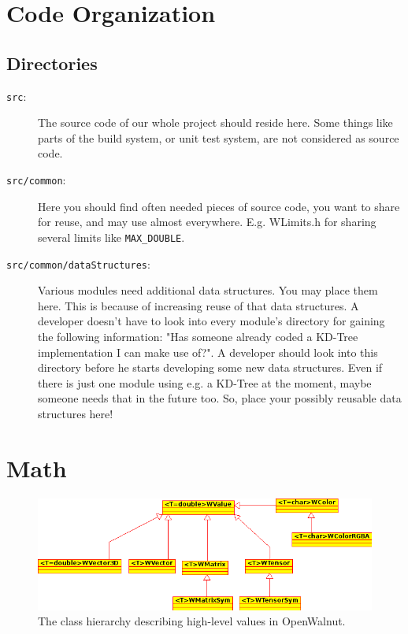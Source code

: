 \documentclass[a4paper,12pt]{scrbook}
\begin{document}
\chapter{Code Organization}
\section{Directories}
\begin{description}
  \item[\texttt{src}:] The source code of our whole project should reside here. Some things like parts of the build system, or unit test system, are not considered as source code.
  \item[\texttt{src/common}:] Here you should find often needed pieces of source code, you want to share for reuse, and may use almost everywhere. E.g. WLimits.h for sharing several limits like \texttt{MAX\_DOUBLE}.
  \item[\texttt{src/common/dataStructures}:] Various modules need additional data structures. You may place them here. This is
    because of increasing reuse of that data structures. A developer doesn't have to look into every module's directory for
    gaining the following information: "Has someone already coded a KD-Tree implementation I can make use of?". A developer should
    look into this directory before he starts developing some new data structures. Even if there is just one module using e.g. a
    KD-Tree at the moment, maybe someone needs that in the future too. So, place your possibly reusable data structures here!
\end{description}

\chapter{Math}


\begin{figure}[htb]
  \includegraphics[width=\textwidth]{WValue_hierachy}
  \caption{The class hierarchy describing high-level values in OpenWalnut.}
\end{figure}
\end{document}
